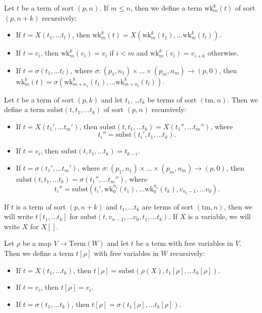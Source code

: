 \documentclass[reqno]{amsart}
\theoremstyle{definition}
\theoremstyle{remark}
\newcommand{\fs}[1]{\mathrm{#1}}
\newcommand{\Term}{\fs{Term}}
\newcommand{\subst}{\fs{subst}}
\newcommand{\wk}{\fs{wk}}
\newcommand{\tm}{\fs{tm}}
\numberwithin{figure}{section}
\begin{document}
Let $t$ be a term of sort $(p,n)$.
If $m \leq n$, then we define a term $\wk^k_m(t)$ of sort $(p,n+k)$ recursively:
\begin{itemize}
\item If $t = X(t_1, \ldots t_l)$, then $\wk^k_m(t) = X(\wk^k_m(t_1), \ldots \wk^k_m(t_l))$.
\item If $t = v_i$, then $\wk^k_m(v_i) = v_i$ if $i < m$ and $\wk^k_m(v_i) = v_{i+k}$ otherwise.
\item If $t = \sigma(t_1, \ldots t_l)$, where $\sigma : (p_1,n_1) \times \ldots \times (p_m,n_m) \to (p,0)$, then $\wk^k_m(t) = \sigma(\wk^k_{m+n_1}(t_1), \ldots \wk^k_{m+n_l}(t_l))$.
\end{itemize}

Let $t$ be a term of sort $(p,k)$ and let $t_1$, \ldots $t_k$ be terms of sort $(\tm,n)$.
Then we define a term $\subst(t, t_1, \ldots t_k)$ of sort $(p,n)$ recursively:
\begin{itemize}
\item If $t = X(t_1', \ldots t_m')$, then $\subst(t, t_1, \ldots t_k) = X(t_1'', \ldots t_m'')$, where
\[ t_i'' = \subst(t_i', t_1, \ldots t_k). \]
\item If $t = v_i$, then $\subst(t, t_1, \ldots t_k) = t_{k-i}$.
\item If $t = \sigma(t_1', \ldots t_m')$, where $\sigma : (p_1,n_1) \times \ldots \times (p_m,n_m) \to (p,0)$, then $\subst(t, t_1, \ldots t_k) = \sigma(t_1'', \ldots t_m'')$, where
\[ t_i'' = \subst(t_i', \wk^{n_i}_0(t_1), \ldots \wk^{n_i}_0(t_k), v_{n_i-1}, \ldots v_0). \]
\end{itemize}

If $t$ is a term of sort $(p,n+k)$ and $t_1, \ldots t_k$ are terms of sort $(\tm,n)$, then we will write $t[t_1, \ldots t_k]$ for $\subst(t, v_{n-1}, \ldots v_0, t_1, \ldots t_k)$.
If $X$ is a variable, we will write $X$ for $X[]$.

Let $\rho$ be a map $V \to \Term(W)$ and let $t$ be a term with free variables in $V$.
Then we define a term $t[\rho]$ with free variables in $W$ recursively:
\begin{itemize}
\item If $t = X(t_1, \ldots t_k)$, then $t[\rho] = \subst(\rho(X), t_1[\rho], \ldots t_k[\rho])$.
\item If $t = v_i$, then $t[\rho] = v_i$.
\item If $t = \sigma(t_1, \ldots t_k)$, then $t[\rho] = \sigma(t_1[\rho], \ldots t_k[\rho])$.
\end{itemize}
\end{document}
